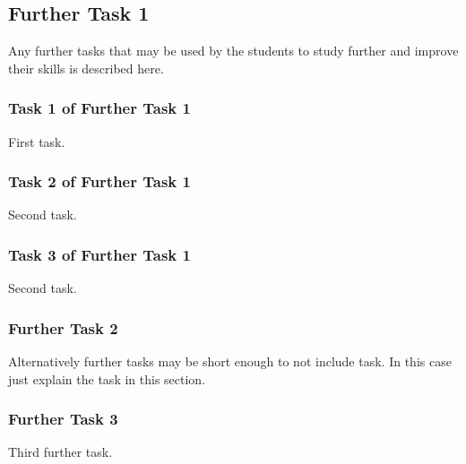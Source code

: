 \documentclass[a4paper]{article}
\begin{document}
	\subsection{Further Task 1}
	Any further tasks that may be used by the students to study further and improve their skills is described here.
	
	\subsubsection{Task 1 of Further Task 1}
	First task.
	
	\subsubsection{Task 2 of Further Task 1}
	Second task.
	
	\subsubsection{Task 3 of Further Task 1}
	Second task.
	
	\subsubsection{Further Task 2}
	Alternatively further tasks may be short enough to not include task. In this case just explain the task in this section.
	
	\subsubsection{Further Task 3}
	Third further task.
	
\end{document}
